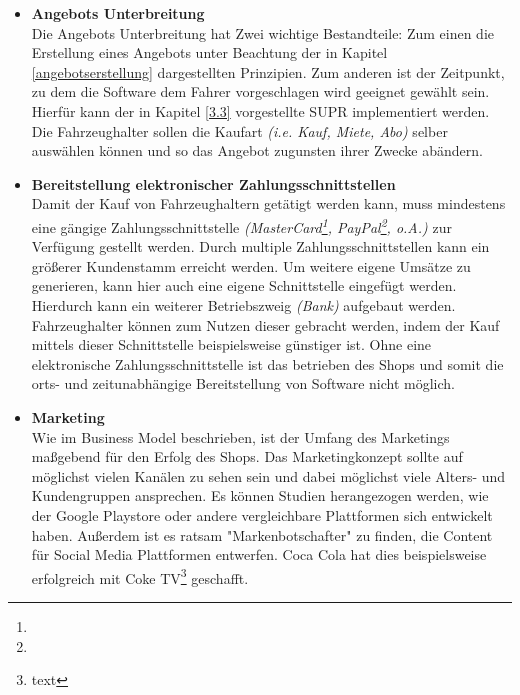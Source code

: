 \begin{itemize}
	Abhängig davon wie neue Softwares bei diesen Simulationen abschneiden werden sie anschließend dem Fahrzeughalter vorgeschlagen oder auch nicht. Durch diesen Prozess wird nicht nur die Kundenzufriedenheit gesteigert, sondern auch mehrere Nutzenversprechen  erfüllt bzw. erarbeitet \textit{(NV-3, NV-4, NV-5)}.
	
	Die in Kapitel \ref{2.3} vorgestellte Möglichkeit der direkten Suche anhand einer Situation sollte im übrigen auch bedacht werden. Sie kann ebenfalls automatisiert werden, indem das Fahrzeug automatische Suchanfragen an den Server verschickt, sobald eine nicht bewältigbare Situation auftritt.
	
	\item[] \hspace{-0.6cm} \textbf{Angebots Unterbreitung}\\
	Die Angebots Unterbreitung hat Zwei wichtige Bestandteile: Zum einen die Erstellung eines Angebots unter Beachtung der in Kapitel \ref{angebotserstellung} dargestellten Prinzipien. Zum anderen ist der Zeitpunkt, zu dem die Software dem Fahrer vorgeschlagen wird geeignet gewählt sein. Hierfür kann der in Kapitel \ref{3.3} vorgestellte SUPR implementiert werden. Die Fahrzeughalter sollen die Kaufart \textit{(i.e. Kauf, Miete, Abo)} selber auswählen können und so das Angebot zugunsten ihrer Zwecke abändern.
	
	\item[] \hspace{-0.6cm} \textbf{Bereitstellung elektronischer Zahlungsschnittstellen}\\
	Damit der Kauf von Fahrzeughaltern getätigt werden kann, muss mindestens eine gängige Zahlungsschnittstelle \textit{(MasterCard\footnote{}, PayPal\footnote{}, o.A.)} zur Verfügung gestellt werden. Durch multiple Zahlungsschnittstellen kann ein größerer Kundenstamm erreicht werden. Um weitere eigene Umsätze zu generieren, kann hier auch eine eigene Schnittstelle eingefügt werden. Hierdurch kann ein weiterer Betriebszweig \textit{(Bank)} aufgebaut werden. Fahrzeughalter können zum Nutzen dieser gebracht werden, indem der Kauf mittels dieser Schnittstelle beispielsweise günstiger ist. Ohne eine elektronische Zahlungsschnittstelle ist das betrieben des Shops und somit die orts- und zeitunabhängige Bereitstellung von Software nicht möglich.
	
	\item[] \hspace{-0.6cm} \textbf{Marketing}\\
	Wie im Business Model beschrieben, ist der Umfang des Marketings maßgebend für den Erfolg des Shops. Das Marketingkonzept sollte auf möglichst vielen Kanälen zu sehen sein und dabei möglichst viele Alters- und Kundengruppen ansprechen. Es können Studien herangezogen werden, wie der Google Playstore oder andere vergleichbare Plattformen sich entwickelt haben. Außerdem ist es ratsam "Markenbotschafter" zu finden, die Content für Social Media Plattformen entwerfen. Coca Cola hat dies beispielsweise erfolgreich mit Coke TV\footnote{text} geschafft.
\end{itemize}
